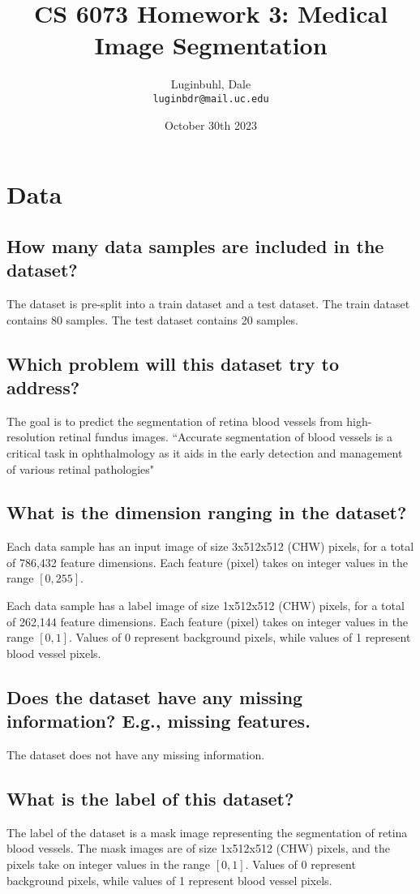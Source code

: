 \documentclass{article}
\title{CS 6073 Homework 3: Medical Image Segmentation}
\author{
    Luginbuhl, Dale \\
    \texttt{luginbdr@mail.uc.edu}
}
\date{October 30th 2023}
\begin{document}
\maketitle

\section{Data}
\subsection{How many data samples are included in the dataset?}
The dataset is pre-split into a train dataset and a test dataset. The train dataset
contains 80 samples. The test dataset contains 20 samples.

\subsection{Which problem will this dataset try to address?}
The goal is to predict the segmentation of retina blood vessels from
high-resolution retinal fundus images. ``Accurate segmentation of
blood vessels is a critical task in ophthalmology as it aids in
the early detection and management of various retinal pathologies"

\subsection{What is the dimension ranging in the dataset?}
Each data sample has an input image of size 3x512x512 (CHW) pixels, for
a total of 786,432 feature dimensions. Each feature (pixel) takes on
integer values in the range $[0,255]$.
\vspace{5mm}

\noindent Each data sample has a label image of size 1x512x512 (CHW)
pixels, for a total of 262,144 feature dimensions. Each feature (pixel) takes
on integer values in the range $[0,1]$. Values of 0 represent background pixels, while
values of 1 represent blood vessel pixels.

\subsection{Does the dataset have any missing information? E.g., missing features.}
The dataset does not have any missing information.

\subsection{What is the label of this dataset?}
The label of the dataset is a mask image representing the segmentation of
retina blood vessels. The mask images are of size 1x512x512 (CHW) pixels, and
the pixels take on integer values in the range $[0,1]$. Values of 0 represent
background pixels, while values of 1 represent blood vessel pixels.
\end{document}

